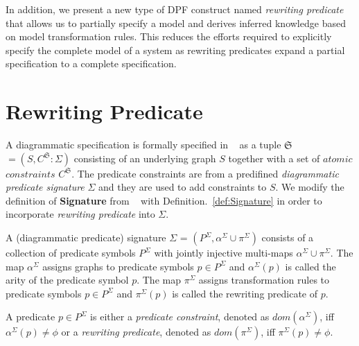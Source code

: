 \documentclass{eceasst}
\begin{document}
In addition, we present a new type of DPF construct named \textit{rewriting predicate} that allows us to partially specify a model and derives inferred knowledge based on model transformation rules. 
This reduces the efforts required to explicitly specify the complete model of a system as rewriting predicates expand a partial specification to a complete specification. 

\section{Rewriting Predicate}
A diagrammatic specification is formally specified in ~\cite{Rutle10} as a tuple $\mathfrak{S}$ $= (S, C^\mathfrak{S}:\Sigma)$ consisting of an underlying graph $S$ together with a set of 
$atomic$ $constraints$ $C^\mathfrak{S}$. The predicate constraints are from a predifined \textit{diagrammatic predicate signature} $\Sigma$ and they are used to add constraints to $S$. 
We modify the definition of \textbf{Signature} from ~\cite{Rutle10} with Definition.~\ref{def:Signature} in order to incorporate \textit{rewriting predicate} into $\Sigma$.


\begin{definition}[Signature]\label{def:Signature}
 A (diagrammatic predicate) signature $\Sigma$ = $(P^\Sigma, \alpha^\Sigma \cup \pi^\Sigma)$ consists of a collection of predicate symbols $P^\Sigma$ with jointly injective 
 multi-maps $\alpha^\Sigma \cup \pi^\Sigma$. The map $\alpha^\Sigma$ assigns graphs to predicate symbols $p \in P^\Sigma$ and $\alpha^\Sigma(p)$ is called the arity of the predicate symbol $p$. 
 The map $\pi^\Sigma$ assigns transformation rules to predicate symbols $p \in P^\Sigma$ and $\pi^\Sigma(p)$ is called the rewriting predicate of $p$. 
\end{definition}

\begin{remark}
A predicate $p \in P^\Sigma$ is either a \textit{predicate constraint}, denoted as $dom(\alpha^\Sigma)$, iff $\alpha^\Sigma(p) \neq \phi$ 
or a \textit{rewriting predicate}, denoted as $dom(\pi^\Sigma)$, iff $\pi^\Sigma(p) \neq \phi$. 
\end{remark}
\end{document}
